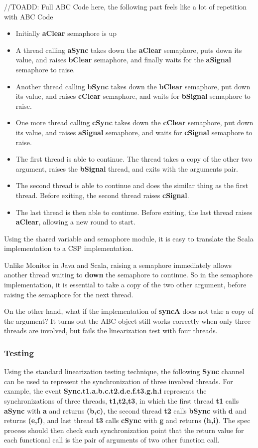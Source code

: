 \documentclass{article}
\begin{document}
//TOADD: Full ABC Code here, the following part feels like a lot of repetition with ABC Code
\begin{itemize}
    \item Initially \textbf{aClear} semaphore is up
    \item A thread calling \textbf{aSync} takes down the \textbf{aClear} semaphore, puts down its value, and raises \textbf{bClear} semaphore, and finally waits for the \textbf{aSignal} semaphore to raise.
    \item Another thread calling \textbf{bSync} takes down the \textbf{bClear} semaphore, put down its value, and raises \textbf{cClear} semaphore, and waits for \textbf{bSignal} semaphore to raise.
    \item One more thread calling \textbf{cSync} takes down the \textbf{cClear} semaphore, put down its value, and raises \textbf{aSignal} semaphore, and waits for \textbf{cSignal} semaphore to raise.
    \item The first thread is able to continue. The thread takes a copy of the other two argument, raises the \textbf{bSignal} thread, and exits with the arguments pair.
    \item The second thread is able to continue and does the similar thing as the first thread. Before exiting, the second thread raises \textbf{cSignal}.
    \item The last thread is then able to continue. Before exiting, the last thread raises \textbf{aClear}, allowing a new round to start.
\end{itemize}

Using the shared variable and semaphore module, it is easy to translate the Scala implementation to a CSP implementation. 

Unlike Monitor in Java and Scala, raising a semaphore immediately allows another thread waiting to \textbf{down} the semaphore to continue. So in the semaphore implementation, it is essential to take a copy of the two other argument, before raising the semaphore for the next thread. 

On the other hand, what if the implementation of \textbf{syncA} does not take a copy of the argument? It turns out the ABC object still works correctly when only three threads are involved, but fails the linearization test with four threads.

\subsubsection{Testing}
Using the standard linearization testing technique, the following \textbf{Sync} channel can be used to represent the synchronization of three involved threads. For example, the event \textbf{Sync.t1.a.b.c.t2.d.e.f.t3.g.h.i} represents the synchronizations of three threads, \textbf{t1,t2,t3}, in which the first thread \textbf{t1} calls \textbf{aSync} with \textbf{a} and returns \textbf{(b,c)}, the second thread \textbf{t2} calls \textbf{bSync} with \textbf{d} and returns \textbf{(e,f)}, and last thread \textbf{t3} calls \textbf{cSync} with \textbf{g} and returns \textbf{(h,i)}. The spec process should then check each synchronization point that the return value for each functional call is the pair of arguments of two other function call.
\end{document}
